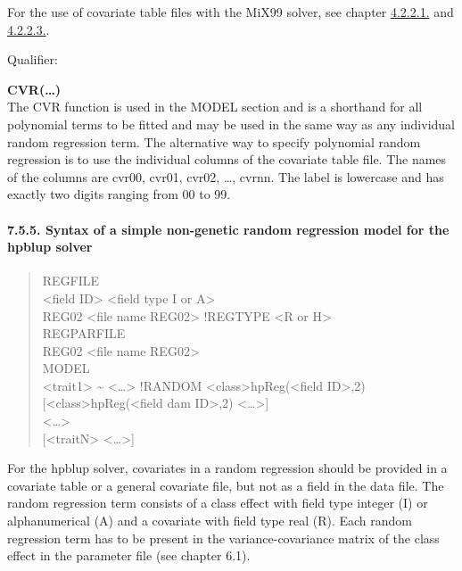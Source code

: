 For the use of covariate table files with the MiX99 solver, see chapter
\hyperref[Obse10]{4.2.2.1.} and \hyperref[Obse12]{4.2.2.3.}.

Qualifier:

\textbf{CVR(\ldots)}\\
The CVR function is used in the MODEL section and is a shorthand for all
polynomial terms to be fitted and may be used in the same way as any
individual random regression term. The alternative way to specify
polynomial random regression is to use the individual columns of the
covariate table file. The names of the columns are cvr00, cvr01, cvr02,
\ldots, cvrnn. The label is lowercase and has exactly two digits ranging
from 00 to 99.

\paragraph{7.5.5. Syntax of a simple non-genetic random regression model
for the hpblup solver}\label{Stat25}

\begin{quote}
REGFILE\\
\textless field ID\textgreater{} \textless field type I or
A\textgreater{}\\
REG02 \textless file name REG02\textgreater{} !REGTYPE \textless R or
H\textgreater{}\\
REGPARFILE\\
REG02 \textless file name REG02\textgreater{}\\
MODEL\\
\textless trait1\textgreater{} \textasciitilde{}
\textless\ldots\textgreater{} !RANDOM
\textless class\textgreater*hpReg(\textless field ID\textgreater,2)
{[}\textless class\textgreater*hpReg(\textless field dam
ID\textgreater,2) \textless\ldots\textgreater{]}\\
\textless\ldots\textgreater{}\\
{[}\textless traitN\textgreater{} \textless\ldots\textgreater{]}
\end{quote}

For the hpblup solver, covariates in a random regression should be
provided in a covariate table or a general covariate file, but not as a
field in the data file. The random regression term consists of a class
effect with field type integer (I) or alphanumerical (A) and a covariate
with field type real (R). Each random regression term has to be present
in the variance-covariance matrix of the class effect in the parameter
file (see chapter 6.1).

